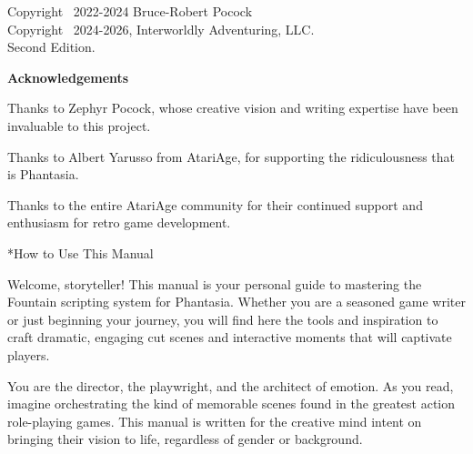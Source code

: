 \documentclass[11pt,letterpaper,oldstylefigures]{memoir}
\makeatletter
\let\oldchapter\chapter
\def\chapter{%
  \@ifstar
    {\FountainScripting@starchapter}%
    {\@dblarg\FountainScripting@chapter}}
\def\FountainScripting@starchapter#1{\oldchapter*{#1}\chaptermark{#1}}
\def\FountainScripting@chapter[#1]#2{\oldchapter[#1]{#2}\chaptermark{#2}}
\newcommand{\Phantasia}{{\irishfont Phantasia}}
\makeatother
\begin{document}
\cleardoublepage
\thispagestyle{empty}
\begin{center}
    \vspace*{2in}
    {\ttfamily Copyright \textcopyright\ 2022-2024 Bruce-Robert Pocock\\
    Copyright \textcopyright\ 2024-2026, Interworldly Adventuring, LLC.\\
    Second Edition.}
\end{center}
\cleardoublepage

\cleardoublepage
\thispagestyle{empty}
\begin{center}
    \vspace*{1.5in}
    {\large\bfseries Acknowledgements}

    \vspace{1in}

    {\large Thanks to Zephyr Pocock, whose creative vision and writing expertise have been
    invaluable to this project.}

    \vspace{0.5in}

    {\large Thanks to Albert Yarusso from AtariAge, for supporting the ridiculousness that is
    \Phantasia.}

    \vspace{0.5in}

    {\large Thanks to the entire AtariAge community for their continued support and enthusiasm
    for retro game development.}
\end{center}
\cleardoublepage


\chapter*{How to Use This Manual}

Welcome, storyteller! This manual is your personal guide to mastering the Fountain scripting system
 for \Phantasia. Whether you are a seasoned game writer or just beginning your journey, you will
  find here the tools and inspiration to craft dramatic, engaging cut scenes and interactive
   moments that will captivate players.

You are the director, the playwright, and the architect of emotion. As you read, imagine orchestrating the kind of memorable scenes found in the greatest action role-playing games. This manual is written for the creative mind intent on bringing their vision to life, regardless of gender or background.
\end{document}

